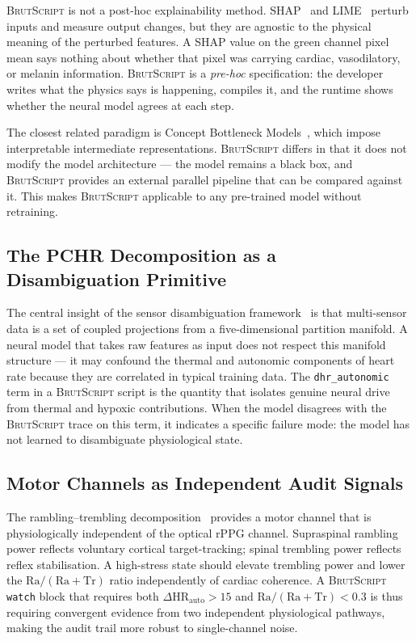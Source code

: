 \documentclass[10pt,twocolumn,a4paper]{article}
\theoremstyle{definition}
\theoremstyle{remark}
\newcommand{\BS}{\textsc{BrutScript}}
\newcommand{\HR}{\mathrm{HR}}
\newcommand{\Ra}{\mathrm{Ra}}
\newcommand{\Tr}{\mathrm{Tr}}
\begin{document}
\BS{} is not a post-hoc explainability method.  SHAP~\cite{lundberg2017shap}
and LIME~\cite{ribeiro2016lime} perturb inputs and measure output
changes, but they are agnostic to the physical meaning of the perturbed
features.  A SHAP value on the green channel pixel mean says nothing
about whether that pixel was carrying cardiac, vasodilatory, or melanin
information.  \BS{} is a \emph{pre-hoc} specification: the developer
writes what the physics says is happening, compiles it, and the runtime
shows whether the neural model agrees at each step.

The closest related paradigm is Concept Bottleneck
Models~\cite{koh2020concept}, which impose interpretable intermediate
representations.  \BS{} differs in that it does not modify the model
architecture --- the model remains a black box, and \BS{} provides an
external parallel pipeline that can be compared against it.  This makes
\BS{} applicable to any pre-trained model without retraining.

\subsection{The PCHR Decomposition as a Disambiguation Primitive}

The central insight of the sensor disambiguation
framework~\cite{sachikonye2024disambiguation} is that multi-sensor
data is a set of coupled projections from a five-dimensional partition
manifold.  A neural model that takes raw features as input does not
respect this manifold structure --- it may confound the thermal and
autonomic components of heart rate because they are correlated in
typical training data.  The \texttt{dhr\_autonomic} term in a \BS{}
script is the quantity that isolates genuine neural drive from thermal
and hypoxic contributions.  When the model disagrees with the
\BS{} trace on this term, it indicates a specific failure mode: the
model has not learned to disambiguate physiological state.

\subsection{Motor Channels as Independent Audit Signals}

The rambling--trembling decomposition~\cite{sachikonye2024posture}
provides a motor channel that is physiologically independent of the
optical rPPG channel.  Supraspinal rambling power reflects voluntary
cortical target-tracking; spinal trembling power reflects reflex
stabilisation.  A high-stress state should elevate trembling power
and lower the $\Ra/(\Ra+\Tr)$ ratio independently of cardiac
coherence.  A \BS{} \texttt{watch} block that requires both
$\Delta\HR_{\mathrm{auto}} > 15$ and $\Ra/(\Ra+\Tr) < 0.3$ is
thus requiring convergent evidence from two independent physiological
pathways, making the audit trail more robust to single-channel noise.
\end{document}
